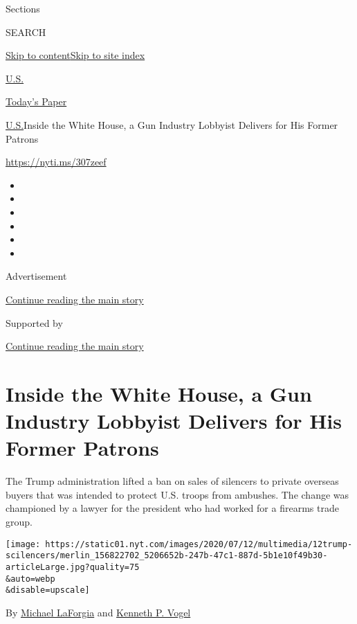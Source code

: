 Sections

SEARCH

\protect\hyperlink{site-content}{Skip to
content}\protect\hyperlink{site-index}{Skip to site index}

\href{https://www.nytimes.com/section/us}{U.S.}

\href{https://myaccount.nytimes.com/auth/login?response_type=cookie\&client_id=vi}{}

\href{https://www.nytimes.com/section/todayspaper}{Today's Paper}

\href{/section/us}{U.S.}\textbar{}Inside the White House, a Gun Industry
Lobbyist Delivers for His Former Patrons

\url{https://nyti.ms/307zeef}

\begin{itemize}
\item
\item
\item
\item
\item
\item
\end{itemize}

Advertisement

\protect\hyperlink{after-top}{Continue reading the main story}

Supported by

\protect\hyperlink{after-sponsor}{Continue reading the main story}

\hypertarget{inside-the-white-house-a-gun-industry-lobbyist-delivers-for-his-former-patrons}{%
\section{Inside the White House, a Gun Industry Lobbyist Delivers for
His Former
Patrons}\label{inside-the-white-house-a-gun-industry-lobbyist-delivers-for-his-former-patrons}}

The Trump administration lifted a ban on sales of silencers to private
overseas buyers that was intended to protect U.S. troops from ambushes.
The change was championed by a lawyer for the president who had worked
for a firearms trade group.

\texttt{[image: https://static01.nyt.com/images/2020/07/12/multimedia/12trump-scilencers/merlin\_156822702\_5206652b-247b-47c1-887d-5b1e10f49b30-articleLarge.jpg?quality=75\\\&auto=webp\\\&disable=upscale]}

By \href{https://www.nytimes.com/by/michael-laforgia}{Michael LaForgia}
and \href{https://www.nytimes.com/by/kenneth-p-vogel}{Kenneth P. Vogel}

